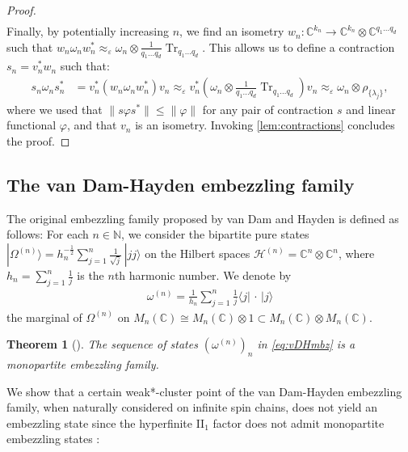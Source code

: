 \documentclass[a4paper, 10pt, onecolumn, accepted=2025-07-22]{quantumarticle}
\newtheorem{theorem}{Theorem}
\theoremstyle{definition}
\newcommand{\ket}[1]{|#1\rangle}
\newcommand{\bra}[1]{\langle#1|}
\newcommand{\norm}[1]{\lVert #1\rVert}
\newcommand{\ox}{\otimes}
\newcommand{\mc}{\mathcal}
\newcommand{\eps}{\varepsilon}
\newcommand{\up}[1]{^{(#1)}}
\DeclareMathOperator{\tr}{Tr}
\def\CC{{\mathbb C}}
\def\H{{\mc H}}
\def\NN{{\mathbb N}}
\newcommand*{\1}{\text{\usefont{U}{bbold}{m}{n}1}}
\newcommand{\placeholder}[0]{{\,\cdot\,}}
\begin{document}
\begin{proof}
\begin{align}
\end{align}
Finally, by potentially increasing $n$, we find an isometry $w_{n}:\CC^{k_{n}}\to\CC^{k_{n}}\ox\CC^{q_{1}...q_{d}}$ such that $w_{n}\omega_{n}w_{n}^{*}\approx_{\eps}\omega_{n}\ox\tfrac{1}{q_{1}...q_{d}}\tr_{q_{1}...q_{d}}$. This allows us to define a contraction $s_{n}=v_{n}^{*}w_{n}$ such that:
\begin{align}
s_{n}\omega_{n}s_{n}^{*} & = v_{n}^{*}(w_{n}\omega_{n}w_{n}^{*})v_{n} \approx_{\eps} v_{n}^{*}(\omega_{n}\ox\tfrac{1}{q_{1}...q_{d}}\tr_{q_{1}...q_{d}})v_{n} \approx_{\eps} \omega_{n}\ox\rho_{\{\lambda_j\}},
\end{align}
where we used that $\norm{s\varphi s^{*}}\leq\norm{\varphi}$ for any pair of contraction $s$ and linear functional $\varphi$, and that $v_{n}$ is an isometry. Invoking \cref{lem:contractions} concludes the proof.
\end{proof}



\subsection{The van Dam-Hayden embezzling family}
\label{sec:vdh}

The original embezzling family proposed by van Dam and Hayden is defined as follows:
For each $n\in\NN$, we consider the bipartite pure states $\ket{\Omega\up{n}} = h_{n}^{-\frac{1}{2}}\sum_{j=1}^{n}\frac{1}{\sqrt{j}}\,\ket{jj}$ 
on the Hilbert spaces $\H\up{n} = \CC^{n}\ox\CC^{n}$, where $h_{n} = \sum_{j=1}^{n}\tfrac{1}{j}$ is the $n$th harmonic number.
We denote by 
\begin{align}\label{eq:vDHmbz}
     \omega\up{n} = \frac{1}{h_{n}} \sum_{j=1}^n \frac{1}{j} \bra j\placeholder \ket j
\end{align} 
the marginal of $\Omega\up{n}$ on $M_{n}(\CC)\cong M_{n}(\CC)\ox1\subset M_{n}(\CC)\ox M_{n}(\CC)$. 

\begin{theorem}[\cite{van_dam2003universal}]
\label{thm:vDHmbz}
The sequence of states $(\omega\up{n})_{n}$ in \cref{eq:vDHmbz} is a monopartite embezzling family.
\end{theorem}


We show that a certain weak*-cluster point of the van Dam-Hayden embezzling family, when naturally considered on infinite spin chains, does not yield an embezzling state since the hyperfinite II$_1$ factor does not admit monopartite embezzling states \cite{long_paper}:
\end{document}
